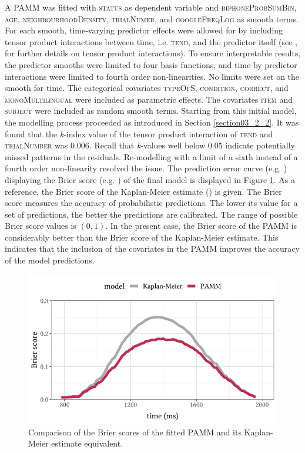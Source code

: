 A PAMM was fitted with \textsc{status} as dependent variable and \textsc{biphoneProbSumBin}, \textsc{age}, \textsc{neighbourhoodDensity}, \textsc{trialNumer}, and \textsc{googleFreqLog} as smooth terms. For each smooth, time-varying predictor effects were allowed for by including tensor product interactions between time, i.e. \textsc{tend}, and the predictor itself (see \cite{Wood2017}, for further details on tensor product interactions). To ensure interpretable results, the predictor smooths were limited to four basis functions, and time-by predictor interactions were limited to fourth order non-linearities. No limits were set on the smooth for time. The categorical covariates \textsc{typeOfS}, \textsc{condition}, \textsc{correct}, and \textsc{monoMultilingual} were included as parametric effects. The covariates \textsc{item} and \textsc{subject} were included as random smooth terms. Starting from this initial model, the modelling process proceeded as introduced in Section \ref{section03_2_2}. It was found that the \textit{k}-index value of the tensor product interaction of \textsc{tend} and \textsc{trialNumber} was $0.006$. Recall that \textit{k}-values well below $0.05$ indicate potentially missed patterns in the residuals. Re-modelling with a limit of a sixth instead of a fourth order non-linearity resolved the issue. The prediction error curve (e.g. \cite{Mogensen2012}) displaying the Brier score (e.g. \cite{Brier1950, Gerds2006, Bradley2008}) of the final model is displayed in Figure \ref{fig:7_2}. As a reference, the Brier score of the Kaplan-Meier estimate (\cite{Kaplan1958}) is given. The Brier score measures the accuracy of probabilistic predictions. The lower its value for a set of predictions, the better the predictions are calibrated. The range of possible Brier score values is $(0,1)$. In the present case, the Brier score of the PAMM is considerably better than the Brier score of the Kaplan-Meier estimate. This indicates that the inclusion of the covariates in the PAMM improves the accuracy of the model predictions. 

\begin{figure}
    \centering
    \includegraphics[]{figures/fig7.2.pdf}
    \caption{Comparison of the Brier scores of the fitted PAMM and its Kaplan-Meier estimate equivalent.}
    \label{fig:7_2}
\end{figure}

